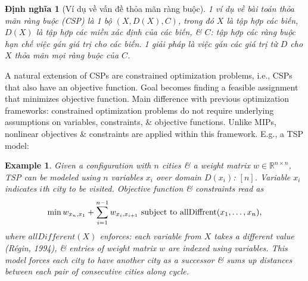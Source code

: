 \documentclass{article}
\newtheorem{dinhnghia}{Định nghĩa}
\newtheorem{example}{Example}
\begin{document}
\begin{itemize}
\begin{itemize}
\begin{itemize}
            \begin{dinhnghia}[Ví dụ về vấn đề thỏa mãn ràng buộc]
                1 ví dụ về bài toán thỏa mãn ràng buộc (CSP) là 1 bộ $(X,D(X),C)$, trong đó $X$ là tập hợp các biến, $D(X)$ là tập hợp các miền xác định của các biến, \& $C$: tập hợp các ràng buộc hạn chế việc gán giá trị cho các biến. 1 giải pháp là việc gán các giá trị từ $D$ cho $X$ thỏa mãn mọi ràng buộc của $C$.
            \end{dinhnghia}
            A natural extension of CSPs are constrained optimization problems, i.e., CSPs that also have an objective function. Goal becomes finding a feasible assignment that minimizes objective function. Main difference with previous optimization frameworks: constrained optimization problems do not require underlying assumptions on variables, constraints, \& objective functions. Unlike MIPs, nonlinear objectives \& constraints are applied within this framework. E.g., a TSP model:

            \begin{example}
                Given a configuration with $n$ cities \& a weight matrix $w\in\mathbb{R}^{n\times n}$, TSP can be modeled using $n$ variables $x_i$ over domain $D(x_i)$: $[n]$. Variable $x_i$ indicates $i$th city to be visited. Objective function \& constraints read as
                \begin{equation*}
                    \min w_{x_n,x_1} + \sum_{i=1}^{n-1} w_{x_i,x_{i+1}}\mbox{ subject to } {\rm allDiffrent}(x_1,\ldots,x_n),
                \end{equation*}
                where $allDifferent(X)$ enforces: each variable from $X$ takes a different value (Régin, 1994), \& entries of weight matrix $w$ are indexed using variables. This model forces each city to have another city as a successor \& sums up distances between each pair of consecutive cities along cycle.


\end{example}
\end{itemize}
\end{itemize}
\end{itemize}
\end{document}
